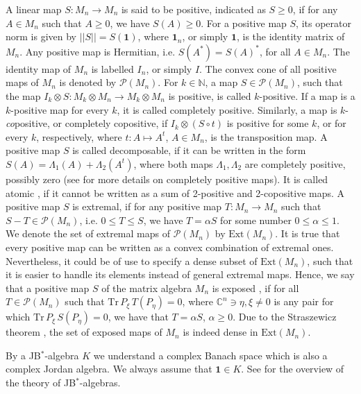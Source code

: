 \documentclass[12pt]{article}
\theoremstyle{plain}
\theoremstyle{definition}
\theoremstyle{remark}
\numberwithin{equation}{section}
\begin{document}
A linear map $S\!: M_{n} \rightarrow M_{n}$ is said to be positive,
indicated as $S \geq 0$,
if for any $A \in M_{n}$ such that $A \geq 0$,
we have $S(A) \geq 0$. 
For a positive map $S$,
its operator norm is given by $||S|| = S(\mathbf{1})$,
where $\mathbf{1}_{n}$, or simply $\mathbf{1}$,
is the identity matrix of $M_{n}$.
Any positive map is Hermitian,
i.e.  $S(A^{*}) = S(A)^{*}$, for all $A \in M_{n}$.
The identity map of $M_{n}$ is labelled $I_{n}$,
or simply $I$.
The convex cone of all positive maps of $M_{n}$ is denoted
by $\mathcal{P}(M_{n})$.
For $k \in \mathbb{N}$, a map $S \in \mathcal{P}(M_{n})$,
such that the map
$I_{k} \otimes S :  M_{k} \! \otimes \! M_{n}
 \rightarrow  M_{k} \! \otimes \! M_{n}$
is positive,
is called $k$-positive.
If a map is a $k$-positive map for every $k$,
it is called completely positive.
Similarly, a map is $k$-\emph{co}positive,
or completely copositive,
if $I_{k} \otimes (S \circ t)$ is positive for
some $k$, or for every $k$, respectively,
where $t \! : A \mapsto A^{t}$,
$A \in M_{n}$, is the transposition map.
A positive map $S$ is called decomposable,
if it can be written in the form
$S(A) = \Lambda_{1}(A) + \Lambda_{2} (A^{t})$,
where both maps $\Lambda_{1}, \Lambda_{2}$ are completely positive,
possibly zero
(see \cite{choi1975completely} for more details on completely positive maps).
It is called atomic \cite{ha1998atomic},
if it cannot be written as a sum of 2-positive and 2-copositive maps.
A positive map $S$ is extremal,
if for any positive map $T: M_{n} \rightarrow M_{n}$ such that
$S - T \in \mathcal{P}(M_{n})$,
i.e. $0 \leq T \leq S$,
we have $T = \alpha S$ for some number $0 \leq \alpha \leq 1$.
We denote the set of extremal maps of $\mathcal{P}(M_{n})$
by $\text{Ext}(M_{n})$.
It is true that every positive map
can be written as a convex combination of extremal ones.
Nevertheless, it could be of use to specify a dense subset
of $\text{Ext}(M_{n})$,
such that it is easier to handle its elements instead of
general extremal maps.
Hence, we say that a positive map $S$ of the matrix algebra
$M_{n}$ is exposed
\cite{marciniak2013rank},
if for all $T \in \mathcal{P}(M_{n})$ such that
$\text{Tr}\, P_{\xi} \, T(P_{\eta}) = 0$,
where $\mathbb{C}^{n} \ni \eta, \xi \neq 0$ is any pair for which
$\text{Tr}\, P_{\xi} \, S(P_{\eta}) = 0$,
we have that $T = \alpha S$, $\alpha \geq 0$.
Due to the Straszewicz theorem \cite{straszewicz1935exponierte},
the set of exposed maps of $M_{n}$ is indeed dense in $\text{Ext}(M_{n})$.

By a JB$^{*}$-algebra $K$ we understand a complex Banach space 
which is also a complex Jordan algebra.
We always assume that $\mathbf{1} \in K$.
See 
\cite{hanche1984jordan}
for the overview of the theory of JB$^{*}$-algebras.
\end{document}
